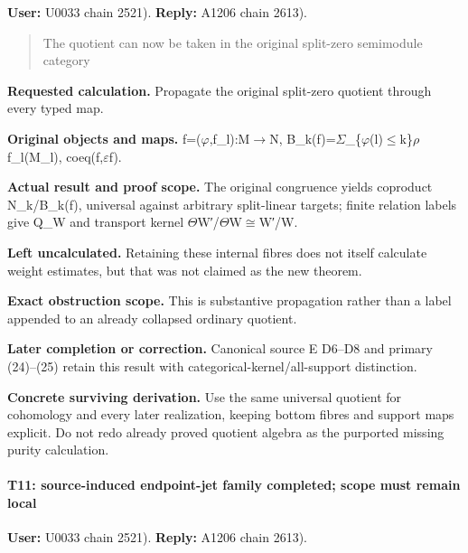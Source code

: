 \textbf{User:} U0033
\protect{} chain 2521).
\textbf{Reply:} A1206
\protect{} chain 2613).

\begin{quote}
The quotient can now be taken in the original split-zero semimodule
category
\end{quote}

\textbf{Requested calculation.} Propagate the original split-zero
quotient through every typed map.

\textbf{Original objects and maps.}
f=(\allowbreak{}\ensuremath{φ}\allowbreak{},f\_l):M\allowbreak{}\ensuremath{→}\allowbreak{}N,
B\_k(f)=\allowbreak{}\ensuremath{Σ}\allowbreak{}\_\{\allowbreak{}\ensuremath{φ}\allowbreak{}(l)\allowbreak{}\ensuremath{≤}\allowbreak{}k\}\allowbreak{}\ensuremath{ρ}\allowbreak{}
f\_l(M\_l), coeq(f,\allowbreak{}\ensuremath{ε}\allowbreak{}f).

\textbf{Actual result and proof scope.} The original congruence yields
coproduct N\_k/B\_k(f), universal against arbitrary split-linear
targets; finite relation labels give Q\_W and transport kernel
\allowbreak{}\ensuremath{Θ}\allowbreak{}W′/\allowbreak{}\ensuremath{Θ}\allowbreak{}W\allowbreak{}\ensuremath{≅}\allowbreak{}W′/W.

\textbf{Left uncalculated.} Retaining these internal fibres does not
itself calculate weight estimates, but that was not claimed as the new
theorem.

\textbf{Exact obstruction scope.} This is substantive propagation rather
than a label appended to an already collapsed ordinary quotient.

\textbf{Later completion or correction.} Canonical source E D6--D8 and
primary (24)--(25) retain this result with
categorical-kernel/all-support distinction.

\textbf{Concrete surviving derivation.} Use the same universal quotient
for cohomology and every later realization, keeping bottom fibres and
support maps explicit. Do not redo already proved quotient algebra as
the purported missing purity calculation.

\paragraph{T11: source-induced endpoint-jet family completed; scope must
remain
local}\label{t11-source-induced-endpoint-jet-family-completed-scope-must-remain-local}

\textbf{User:} U0033
\protect{} chain 2521).
\textbf{Reply:} A1206
\protect{} chain 2613).

